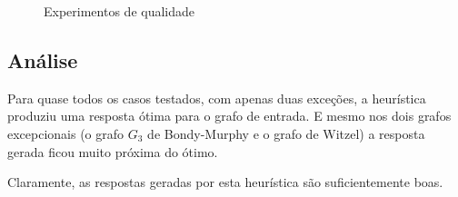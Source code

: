 \begin{figure}[htb!]
\centering
{}
\caption{Experimentos de qualidade}
\label{fig:eq4}
\end{figure}

\clearpage

\subsection{Análise}
Para quase todos os casos testados, com apenas duas exceções, a
heurística produziu uma resposta ótima para o grafo de entrada. E
mesmo nos dois grafos excepcionais (o grafo $G_3$ de Bondy-Murphy e o
grafo de Witzel) a resposta gerada ficou muito próxima do ótimo.

Claramente, as respostas geradas por esta heurística são
suficientemente boas.
